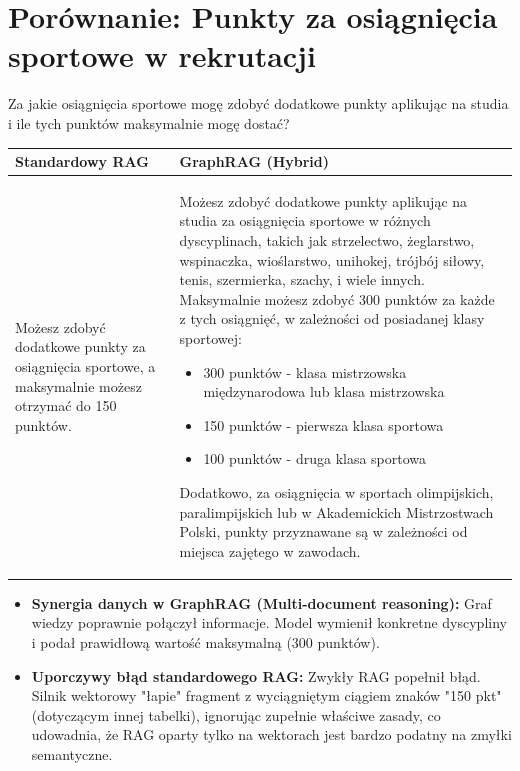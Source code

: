 \newpage

\section*{Porównanie: Punkty za osiągnięcia sportowe w rekrutacji}

\begin{tcolorbox}[colback=blue!5!white,colframe=blue!75!black,title=Pytanie użytkownika]
    Za jakie osiągnięcia sportowe mogę zdobyć dodatkowe punkty aplikując na studia i ile tych punktów maksymalnie mogę dostać?
\end{tcolorbox}

\noindent
\begin{tabularx}{\textwidth}{@{} XX @{}}
    \toprule
    \textbf{Standardowy RAG} & \textbf{GraphRAG (Hybrid)} \\
    \midrule
    \small 
    Możesz zdobyć dodatkowe punkty za osiągnięcia sportowe, a maksymalnie możesz otrzymać do 150 punktów.
    & 
    \small 
    Możesz zdobyć dodatkowe punkty aplikując na studia za osiągnięcia sportowe w różnych dyscyplinach, takich jak strzelectwo, żeglarstwo, wspinaczka, wioślarstwo, unihokej, trójbój siłowy, tenis, szermierka, szachy, i wiele innych. Maksymalnie możesz zdobyć 300 punktów za każde z tych osiągnięć, w zależności od posiadanej klasy sportowej:
    \begin{itemize}
        \item 300 punktów - klasa mistrzowska międzynarodowa lub klasa mistrzowska
        \item 150 punktów - pierwsza klasa sportowa
        \item 100 punktów - druga klasa sportowa
    \end{itemize}
    Dodatkowo, za osiągnięcia w sportach olimpijskich, paralimpijskich lub w Akademickich Mistrzostwach Polski, punkty przyznawane są w zależności od miejsca zajętego w zawodach. \\
    \bottomrule
\end{tabularx}

\begin{tcolorbox}[colback=green!5!white,colframe=green!50!black,title=Wnioski i obserwacje]
    \begin{itemize}
        \item \textbf{Synergia danych w GraphRAG (Multi-document reasoning):} Graf wiedzy poprawnie połączył informacje. Model wymienił konkretne dyscypliny i podał prawidłową wartość maksymalną (300 punktów).
        \item \textbf{Uporczywy błąd standardowego RAG:} Zwykły RAG popełnił błąd. Silnik wektorowy "łapie" fragment z wyciągniętym ciągiem znaków "150 pkt" (dotyczącym innej tabelki), ignorując zupełnie właściwe zasady, co udowadnia, że RAG oparty tylko na wektorach jest bardzo podatny na zmyłki semantyczne.
    \end{itemize}
\end{tcolorbox}
\vspace{1em}

